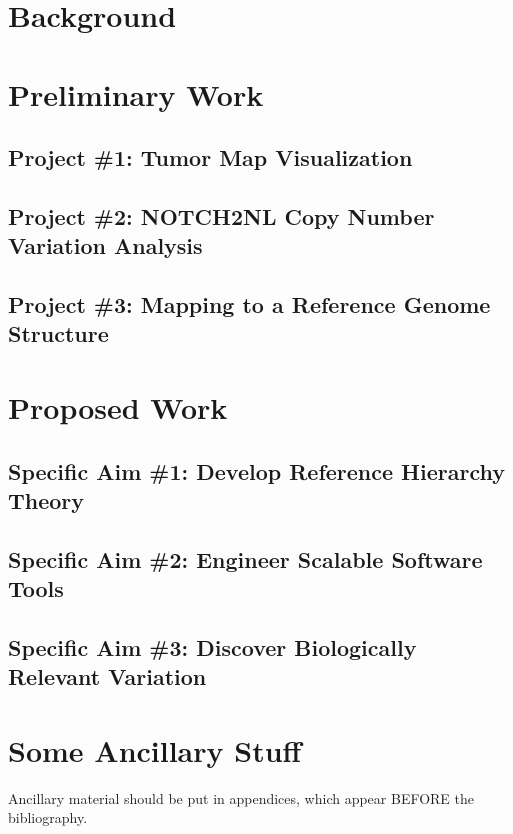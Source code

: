 \documentclass[11pt,proposal]{ucthesis}
\begin{document}
\chapter{Background}

\chapter{Preliminary Work}

\section{Project \#1: Tumor Map Visualization}

\section{Project \#2: NOTCH2NL Copy Number Variation Analysis}

\section{Project \#3: Mapping to a Reference Genome Structure}

\chapter{Proposed Work}

\section{Specific Aim \#1: Develop Reference Hierarchy Theory}

\section{Specific Aim \#2: Engineer Scalable Software Tools}

\section{Specific Aim \#3: Discover Biologically Relevant Variation}

\appendix
\chapter{Some Ancillary Stuff}

Ancillary material should be put in appendices, which appear BEFORE the
bibliography. 


\nocite{*}

\def\baselinestretch{1.0}\large\normalsize



\end{document}
